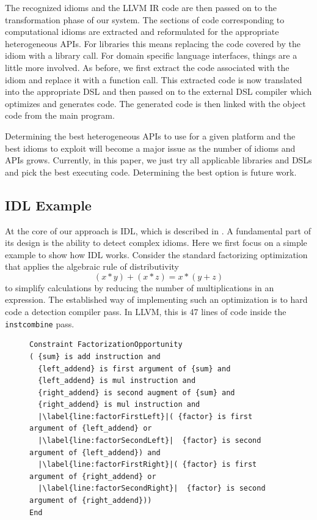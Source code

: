     The recognized idioms and the LLVM IR code are then passed on
    to the transformation phase of our system.
    The sections of code corresponding to computational idioms are extracted
    and reformulated for the appropriate heterogeneous APIs.
    For libraries this means replacing
    the code covered by the idiom with a library call. 
    For domain specific language interfaces,
    things are a little more involved. As before, we first extract the code
    associated with the idiom and replace it with a function call. This
    extracted code is now translated into the appropriate DSL and then
    passed on to the external DSL compiler which optimizes and generates
    code. The generated code is then linked
    with the object code from the main program.

    Determining the best heterogeneous APIs to use for a given platform
    and the best idioms to exploit will become a major issue as the number
    of idioms and APIs grows.  Currently, in this paper, we just try all
    applicable libraries and DSLs and pick the best executing
    code. Determining the best option is future work.

\subsection{IDL Example}

    At the core of our approach is IDL, which is described in .
    A fundamental part of its design is the
    ability to detect  complex idioms.  Here we first focus on a simple example
    to show how IDL works.  Consider the standard factorizing
    optimization that applies the algebraic rule of distributivity
    \[(x*y)+(x*z) = x*(y+z)\]
    to simplify calculations by reducing the number of multiplications in an
    expression.
    The established way of implementing such an optimization is to hard code a
    detection compiler pass.
    In LLVM, this is 47 lines of code inside the \texttt{instcombine} pass.

\begin{figure}[t]
\begin{lstlisting}[language={constraints},escapechar=|,
                   label={fig:IDLfactorization},caption=
   {IDL formulation of $\protect{(x*y)+(x*z)}$ pattern}]
Constraint FactorizationOpportunity
( {sum} is add instruction and
  {left_addend} is first argument of {sum} and
  {left_addend} is mul instruction and
  {right_addend} is second augment of {sum} and
  {right_addend} is mul instruction and
  |\label{line:factorFirstLeft}|( {factor} is first argument of {left_addend} or
  |\label{line:factorSecondLeft}|  {factor} is second argument of {left_addend}) and
  |\label{line:factorFirstRight}|( {factor} is first argument of {right_addend} or
  |\label{line:factorSecondRight}|  {factor} is second argument of {right_addend}))
End
\end{lstlisting}
\end{figure}

